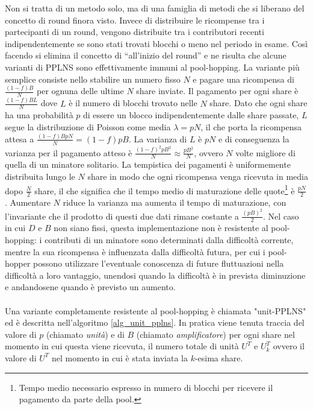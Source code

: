 Non si tratta di un metodo solo, ma di una famiglia di metodi che si liberano del concetto di round finora visto.
Invece di distribuire le ricompense tra i partecipanti di un round, vengono distribuite tra i contributori recenti indipendentemente se sono stati trovati blocchi o meno nel periodo in esame. Così facendo si elimina il concetto di ``all'inizio del round'' e ne risulta che alcune varianti di PPLNS sono effettivamente immuni al pool-hopping.
La variante più semplice consiste nello stabilire un numero fisso $N$ e pagare una ricompensa di $\frac{(1-f)B}{N}$ per ognuna delle ultime $N$ share inviate. Il pagamento per ogni share è $\frac{(1-f)BL}{N}$ dove $L$ è il numero di blocchi trovato nelle $N$ share. Dato che ogni share ha una probabilità $p$ di essere un blocco indipendentemente dalle share passate, $L$ segue la distribuzione di Poisson come media $\lambda = pN$, il che porta la ricompensa attesa a $\frac{(1-f)BpN}{N} = (1-f)pB$. La varianza di $L$ è $pN$ e di conseguenza la varianza per il pagamento atteso è $\frac{(1-f)^2 pB^2}{N} \approx \frac{pB^2}{N}$, ovvero $N$ volte migliore di quella di un minatore solitario.
La tempistica dei pagamenti è uniformemente distribuita lungo le $N$ share in modo che ogni ricompensa venga ricevuta in media dopo $\frac{N}{2}$ share, il che significa che il tempo medio di maturazione delle quote\footnote{Tempo medio necessario espresso in numero di blocchi per ricevere il pagamento da parte della pool.} è $\frac{pN}{2}$. Aumentare $N$ riduce la varianza ma aumenta il tempo di maturazione, con l'invariante che il prodotto di questi due dati rimane costante a $\frac{(pB)^2}{2}$.
Nel caso in cui $D$ e $B$ non siano fissi, questa implementazione non è resistente al pool-hopping: i contributi di un minatore sono determinati dalla difficoltà corrente, mentre la sua ricompensa è influenzata dalla difficoltà futura, per cui i pool-hopper possono utilizzare l'eventuale conoscenza di future fluttuazioni nella difficoltà a loro vantaggio, unendosi quando la difficoltà è in prevista diminuzione e andandosene quando è previsto un aumento.\\\\
Una variante completamente resistente al pool-hopping è chiamata "unit-PPLNS" ed è descritta nell'algoritmo \ref{alg_unit_pplns}. In pratica viene tenuta traccia del valore di $p$ (chiamato \emph{unità}) e di $B$ (chiamato \emph{amplificatore}) per ogni share nel momento in cui questa viene ricevuta, il numero totale di unità $U^T$ e $U^T_k$ ovvero il valore di $U^T$ nel momento in cui è stata inviata la $k$-esima share.
